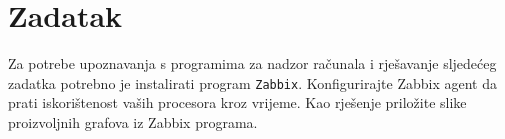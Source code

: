 \documentclass[12pt,a4paper]{article}
\begin{document}
    \section{Zadatak}
    
    Za potrebe upoznavanja s programima za nadzor računala i rješavanje sljedećeg zadatka potrebno je instalirati program \texttt{Zabbix}.
    Konfigurirajte Zabbix agent da prati iskorištenost vaših procesora kroz vrijeme.
    Kao rješenje priložite slike proizvoljnih grafova iz Zabbix programa.
	
\end{document}
